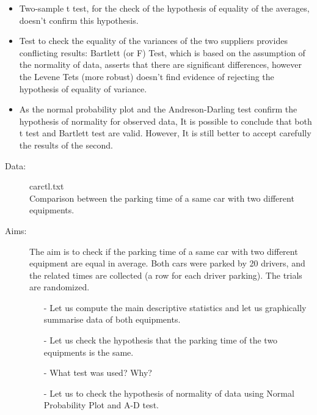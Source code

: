 \begin{frame}
  \begin{itemize}
    \item Two-sample t test, for the check of the hypothesis of equality of the averages, doesn't confirm this hypothesis.
    \vspace{0.3cm}
    \item Test to check the equality of the variances of the two suppliers provides conflicting results: Bartlett (or F) Test, which is based on the assumption of the normality of data, asserts that there are significant differences, however the Levene Tets (more robust) doesn't find evidence of rejecting the hypothesis of equality of variance.
    \vspace{0.3cm}
    \item As the normal probability plot and the Andreson-Darling test confirm the hypothesis of normality for observed data, It is possible to conclude that both t test and Bartlett test are valid. However, It is still better to accept carefully the results of the second.
  \end{itemize}
\end{frame}





\begin{frame} 
  \begin{description}
    \item[Data:] carctl.txt\\ 
      Comparison between the parking time of a same car with two different equipments.
    \item[Aims:]
      \begin{small}
        The aim is to check if the parking time of a same car with two different equipment are equal in average. Both cars were parked by 20 drivers, and the related times are collected (a row for each driver parking). The trials are randomized.  
        \begin{itemize}
          \item[-] Let us compute the main descriptive statistics and let us graphically summarise data of both equipments.
          \item[-] Let us check the hypothesis that the parking time of the two equipments is the same.
          \item[-] What test was used? Why?
          \item[-] Let us to check the hypothesis of normality of data using Normal Probability Plot and A-D test. 
        \end{itemize}
      \end{small}
  \end{description}
\end{frame}

